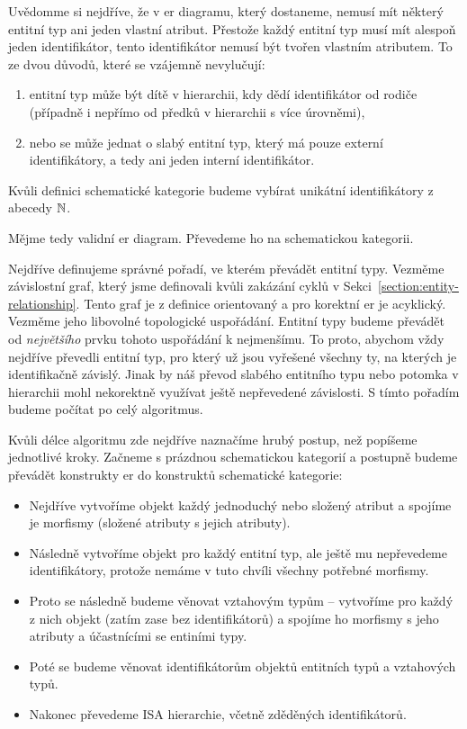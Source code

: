 Uvědomme si nejdříve, že v \acrshort{er} diagramu, který dostaneme, nemusí mít některý entitní typ ani jeden vlastní atribut.
Přestože každý entitní typ musí mít alespoň jeden identifikátor, tento identifikátor nemusí být tvořen vlastním atributem.
To ze dvou důvodů, které se vzájemně nevylučují:
\begin{enumerate}
  \item entitní typ může být dítě v hierarchii, kdy dědí identifikátor od rodiče (případně i nepřímo od předků v hierarchii s více úrovněmi),
  \item nebo se může jednat o slabý entitní typ, který má pouze externí identifikátory, a tedy ani jeden interní identifikátor.
\end{enumerate}

Kvůli definici schematické kategorie budeme vybírat unikátní identifikátory z abecedy $\mathbb{N}$.

Mějme tedy validní \acrshort{er} diagram.
Převedeme ho na schematickou kategorii.

Nejdříve definujeme správné pořadí, ve kterém převádět entitní typy.
Vezměme závislostní graf, který jsme definovali kvůli zakázání cyklů v Sekci~\ref{section:entity-relationship}.
Tento graf je z definice orientovaný a pro korektní \acrshort{er} je acyklický.
Vezměme jeho libovolné topologické uspořádání.
Entitní typy budeme převádět od \emph{největšího} prvku tohoto uspořádání k nejmenšímu.
To proto, abychom vždy nejdříve převedli entitní typ, pro který už jsou vyřešené všechny ty, na kterých je identifikačně závislý.
Jinak by náš převod slabého entitního typu nebo potomka v hierarchii mohl nekorektně využívat ještě nepřevedené závislosti.
S tímto pořadím budeme počítat po celý algoritmus.

Kvůli délce algoritmu zde nejdříve naznačíme hrubý postup, než popíšeme jednotlivé kroky.
Začneme s prázdnou schematickou kategorií a postupně budeme převádět konstrukty \acrshort{er} do konstruktů schematické kategorie:
\begin{itemize}
  \item Nejdříve vytvoříme objekt každý jednoduchý nebo složený atribut a spojíme je morfismy (složené atributy s jejich atributy).
  \item Následně vytvoříme objekt pro každý entitní typ, ale ještě mu nepřevedeme identifikátory, protože nemáme v tuto chvíli všechny potřebné morfismy.
  \item Proto se následně budeme věnovat vztahovým typům -- vytvoříme pro každý z nich objekt (zatím zase bez identifikátorů) a spojíme ho morfismy s jeho atributy a účastnícími se entiními typy.
  \item Poté se budeme věnovat identifikátorům objektů entitních typů a vztahových typů.
  \item Nakonec převedeme ISA hierarchie, včetně zděděných identifikátorů.
\end{itemize}

